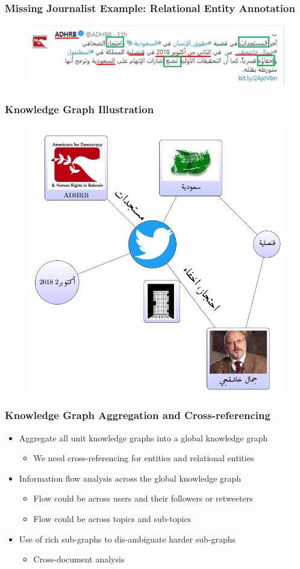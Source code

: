 \documentclass[xcolor=table]{beamer}
\newcommand{\bi}{\begin{itemize}}
\newcommand{\ei}{\end{itemize}}
\newcommand{\I}{\item}
\begin{document}
\begin{frame}
\frametitle{Missing Journalist Example: Relational Entity Annotation}
\begin{figure}[!htb]
   \centering
    \includegraphics[scale=0.55]{img0009_2.png}
    
\end{figure}
\end{frame}


\begin{frame}
\frametitle{Knowledge Graph Illustration}
\begin{figure}[!htb]
   \centering
    \includegraphics[scale=0.38]{graph2.png}
    
\end{figure}

\end{frame}
\begin{frame}
\frametitle{Knowledge Graph Aggregation and Cross-referencing} 

\bi
\I Aggregate all unit knowledge graphs into a global knowledge graph
  \bi \I We need cross-referencing for entities and relational entities
  \ei 
\I Information flow analysis across the global knowledge graph
  \bi \I Flow could be across users and their followers or retweeters
      \I Flow could be across topics and sub-topics 
  \ei 
\I Use of rich sub-graphs to dis-ambiguate harder sub-graphs 
  \bi \I Cross-document analysis 
  \ei 
\ei 

\end{frame} 
\end{document}
